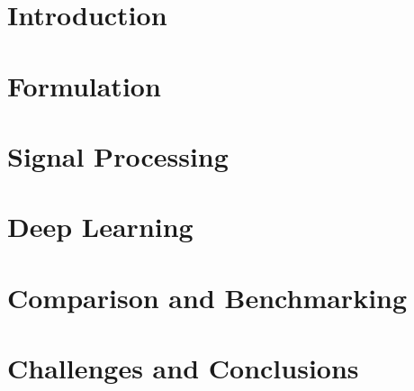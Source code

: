 \documentclass[harvard]{lincolncsuthesis}
\begin{document}
\maketitle

%






\thesisTables

\thesisBodyStart

\chapter{Introduction}


% 

\chapter{Formulation}


\chapter{Signal Processing}


\chapter{Deep Learning}


\chapter{Comparison and Benchmarking}


\chapter{Challenges and Conclusions}

\end{document}
